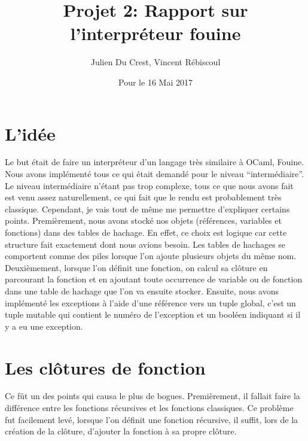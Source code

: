 \documentclass[10pt,a4paper]{article}
\title{Projet 2: Rapport sur l'interpréteur fouine}
\author{Julien Du Crest, Vincent Rébiscoul}
\date{Pour le 16 Mai 2017}
\begin{document}
\maketitle

\section{L'idée}
Le but était de faire un interpréteur d'un langage très similaire à OCaml, Fouine. Nous avons implémenté tous ce qui était demandé pour le niveau ``intermédiaire''. Le niveau intermédiaire n'étant pas trop complexe, tous ce que nous avons fait est venu assez naturellement, ce qui fait que le rendu est probablement très classique. Cependant, je vais tout de même me permettre d'expliquer certains points. Premièrement, nous avons stocké nos objets (références, variables et fonctions) dans des tables de hachage. En effet, ce choix est logique car cette structure fait exactement dont nous avions besoin. Les tables de hachages se comportent comme des piles lorsque l'on ajoute plusieurs objets du même nom. Deuxièmement, lorsque l'on définit une fonction, on calcul sa clôture en parcourant la fonction et en ajoutant toute occurrence de variable ou de fonction dans une table de hachage que l'on va ensuite stocker. Ensuite, nous avons implémenté les exceptions à l'aide d'une référence vers un tuple global, c'est un tuple mutable qui contient le numéro de l'exception et un booléen indiquant si il y a eu une exception. 



\section{Les clôtures de fonction}
Ce fût un des points qui causa le plus de bogues. Premièrement, il fallait faire la différence entre les fonctions récursives et les fonctions classiques. Ce problème fut facilement levé, lorsque l'on définit une fonction récursive, il suffit, lors de la création de la clôture, d'ajouter la fonction à sa propre clôture. 
\end{document}

